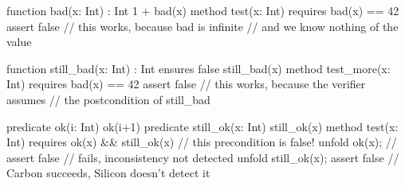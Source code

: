 function bad(x: Int) : Int { 
    1 + bad(x) 
}
method test(x: Int) 
    requires bad(x) == 42
{
    assert false 
    // this works, because bad is infinite 
    // and we know nothing of the value
}

function still_bad(x: Int) : Int 
    ensures false
{ 
    still_bad(x) 
}
method test_more(x: Int) 
    requires bad(x) == 42
{ 
    assert false 
    // this works, because the verifier assumes 
    // the postcondition of still_bad
}

predicate ok(i: Int) { 
    ok(i+1) 
}
predicate still_ok(x: Int) { 
    still_ok(x) 
}
method test(x: Int)
    requires ok(x) && still_ok(x) // this precondition is false!
{
    unfold ok(x);
    // assert false // fails, inconsistency not detected 
    unfold still_ok(x);
    assert false // Carbon succeeds, Silicon doesn’t detect it
}